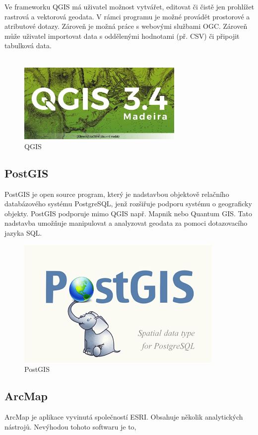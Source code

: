 \documentclass[a4paper, 12pt]{article}
\begin{document}
Ve frameworku QGIS má uživatel možnost vytvářet, editovat či čistě jen prohlížet rastrová a vektorová geodata. V rámci programu je možné provádět prostorové a atributové dotazy. Zároveň je možná práce s webovými službami OGC. Zároveň může uživatel importovat data s oddělenými hodnotami (př. CSV) či připojit tabulková data.\\
\\

\begin{figure}[h!]
	\centering
	\includegraphics[width=8cm]{pictures/qgis.jpg}
	\caption{QGIS}
\end{figure}

\subsection{PostGIS}
PostGIS je open source program, který je nadstavbou objektově relačního databázového systému PostgreSQL, jenž rozšiřuje podporu systému o geograficky objekty. PostGIS podporuje mimo QGIS např. Mapnik nebo Quantum GIS. Tato nadstavba umožňuje manipulovat a analyzovat geodata za pomoci dotazovacího jazyka SQL. 

\begin{figure}[h!]
	\centering
	\includegraphics[width=10cm]{pictures/postgis.png}
	\caption{PostGIS}
\end{figure}

\subsection{ArcMap}
ArcMap je aplikace vyvinutá společností ESRI. Obsahuje několik analytických nástrojů. Nevýhodou tohoto softwaru je to, 
\end{document}
